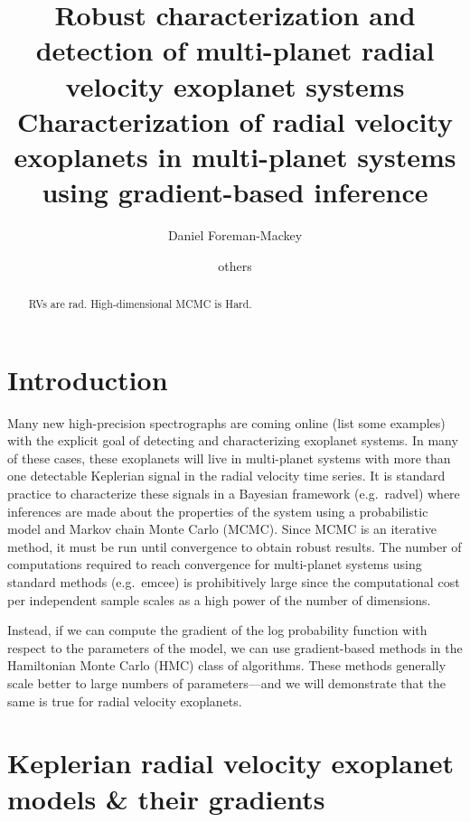 \documentclass[modern]{aastex62}
\begin{document}
\raggedbottom\sloppy\sloppypar\frenchspacing

\title{%
Robust characterization and detection of multi-planet radial velocity
exoplanet systems
Characterization of radial velocity exoplanets in multi-planet systems using
gradient-based inference
}

\author[0000-0002-9328-5652]{Daniel Foreman-Mackey}

\author{others}

\begin{abstract}

RVs are rad.
High-dimensional MCMC is Hard.

\end{abstract}


\section{Introduction}

Many new high-precision spectrographs are coming online (list some examples)
with the explicit goal of detecting and characterizing exoplanet systems.
In many of these cases, these exoplanets will live in multi-planet systems
with more than one detectable Keplerian signal in the radial velocity time
series.
It is standard practice to characterize these signals in a Bayesian framework
(e.g.~radvel) where inferences are made about the properties of the system
using a probabilistic model and Markov chain Monte Carlo (MCMC).
Since MCMC is an iterative method, it must be run until convergence to obtain
robust results.
The number of computations required to reach convergence for multi-planet
systems using standard methods (e.g.~emcee) is prohibitively large since the
computational cost per independent sample scales as a high power of the number
of dimensions.

Instead, if we can compute the gradient of the log probability function with
respect to the parameters of the model, we can use gradient-based methods in
the Hamiltonian Monte Carlo (HMC) class of algorithms.
These methods generally scale better to large numbers of parameters---and we
will demonstrate that the same is true for radial velocity exoplanets.

\section{Keplerian radial velocity exoplanet models \& their gradients}
\end{document}
